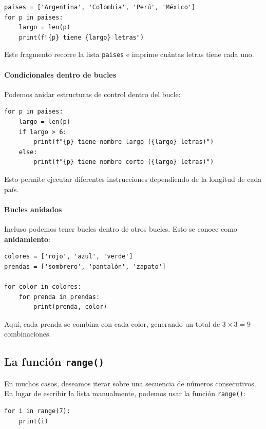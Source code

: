 \documentclass{article}
\theoremstyle{nonumberplain}
\begin{document}
\begin{verbatim}
paises = ['Argentina', 'Colombia', 'Perú', 'México']
for p in paises:
    largo = len(p)
    print(f"{p} tiene {largo} letras")
\end{verbatim}

Este fragmento recorre la lista \texttt{paises} e imprime cuántas letras tiene cada uno.

\paragraph{Condicionales dentro de bucles}

Podemos anidar estructuras de control dentro del bucle:

\begin{verbatim}
for p in paises:
    largo = len(p)
    if largo > 6:
        print(f"{p} tiene nombre largo ({largo} letras)")
    else:
        print(f"{p} tiene nombre corto ({largo} letras)")
\end{verbatim}

Esto permite ejecutar diferentes instrucciones dependiendo de la longitud de cada país.

\paragraph{Bucles anidados}

Incluso podemos tener bucles dentro de otros bucles. Esto se conoce como \textbf{anidamiento}:

\begin{verbatim}
colores = ['rojo', 'azul', 'verde']
prendas = ['sombrero', 'pantalón', 'zapato']

for color in colores:
    for prenda in prendas:
        print(prenda, color)
\end{verbatim}

Aquí, cada prenda se combina con cada color, generando un total de $3 \times 3 = 9$ combinaciones.



\subsection*{La función \texttt{range()}}

En muchos casos, deseamos iterar sobre una secuencia de números consecutivos. En lugar de escribir la lista manualmente, podemos usar la función \texttt{range()}:

\begin{verbatim}
for i in range(7):
    print(i)
\end{verbatim}
\end{document}
